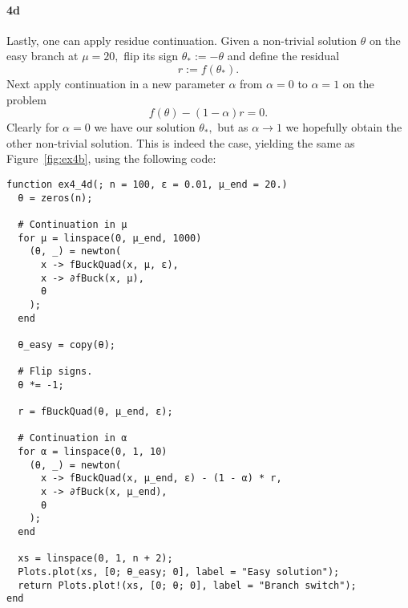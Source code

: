 \documentclass[a4paper]{article}
\begin{document}
  \paragraph{4d} Lastly, one can apply residue continuation. Given a non-trivial solution $\theta$ on the easy branch at $\mu = 20,$ flip its sign $\theta_* := -\theta$ and define the residual $$r := f(\theta_*).$$ Next apply continuation in a new parameter $\alpha$ from $\alpha = 0$ to $\alpha = 1$ on the problem $$f(\theta) - (1 - \alpha)r = 0.$$ Clearly for $\alpha = 0$ we have our solution $\theta_*,$ but as $\alpha \to 1$ we hopefully obtain the other non-trivial solution. This is indeed the case, yielding the same as Figure~\ref{fig:ex4b}, using the following code:
\begin{verbatim}
function ex4_4d(; n = 100, ɛ = 0.01, μ_end = 20.)
  θ = zeros(n);

  # Continuation in μ
  for μ = linspace(0, μ_end, 1000)
    (θ, _) = newton(
      x -> fBuckQuad(x, μ, ɛ),
      x -> ∂fBuck(x, μ),
      θ
    );
  end

  θ_easy = copy(θ);

  # Flip signs.
  θ *= -1;

  r = fBuckQuad(θ, μ_end, ɛ);

  # Continuation in α
  for α = linspace(0, 1, 10)
    (θ, _) = newton(
      x -> fBuckQuad(x, μ_end, ɛ) - (1 - α) * r,
      x -> ∂fBuck(x, μ_end),
      θ
    );
  end

  xs = linspace(0, 1, n + 2);
  Plots.plot(xs, [0; θ_easy; 0], label = "Easy solution");
  return Plots.plot!(xs, [0; θ; 0], label = "Branch switch");
end
\end{verbatim}

  \appendix
  \newpage
\end{document}
